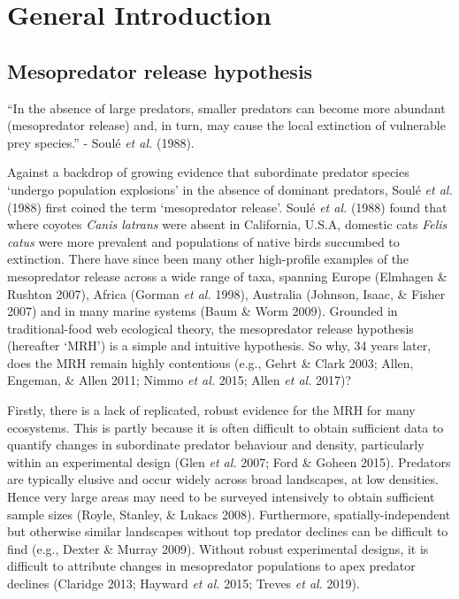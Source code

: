 \documentclass[11pt,a4paper,titlepage,twoside,openright]{style/unimelbthesis}
\begin{document}
\begin{mainmatter}

\hypertarget{general-introduction}{%
\chapter{General Introduction}\label{general-introduction}}

\hypertarget{mesopredator-release-hypothesis}{%
\section{Mesopredator release hypothesis}\label{mesopredator-release-hypothesis}}

``In the absence of large predators, smaller predators can become more abundant (mesopredator release) and, in turn, may cause the local extinction of vulnerable prey species.'' - Soulé \emph{et al.} (1988).

Against a backdrop of growing evidence that subordinate predator species `undergo population explosions' in the absence of dominant predators, Soulé \emph{et al.} (1988) first coined the term `mesopredator release'. Soulé \emph{et al.} (1988) found that where coyotes \emph{Canis latrans} were absent in California, U.S.A, domestic cats \emph{Felis catus} were more prevalent and populations of native birds succumbed to extinction. There have since been many other high-profile examples of the mesopredator release across a wide range of taxa, spanning Europe (Elmhagen \& Rushton 2007), Africa (Gorman \emph{et al.} 1998), Australia (Johnson, Isaac, \& Fisher 2007) and in many marine systems (Baum \& Worm 2009). Grounded in traditional-food web ecological theory, the mesopredator release hypothesis (hereafter `MRH') is a simple and intuitive hypothesis. So why, 34 years later, does the MRH remain highly contentious (e.g., Gehrt \& Clark 2003; Allen, Engeman, \& Allen 2011; Nimmo \emph{et al.} 2015; Allen \emph{et al.} 2017)?

Firstly, there is a lack of replicated, robust evidence for the MRH for many ecosystems. This is partly because it is often difficult to obtain sufficient data to quantify changes in subordinate predator behaviour and density, particularly within an experimental design (Glen \emph{et al.} 2007; Ford \& Goheen 2015). Predators are typically elusive and occur widely across broad landscapes, at low densities. Hence very large areas may need to be surveyed intensively to obtain sufficient sample sizes (Royle, Stanley, \& Lukacs 2008). Furthermore, spatially-independent but otherwise similar landscapes without top predator declines can be difficult to find (e.g., Dexter \& Murray 2009). Without robust experimental designs, it is difficult to attribute changes in mesopredator populations to apex predator declines (Claridge 2013; Hayward \emph{et al.} 2015; Treves \emph{et al.} 2019).


\end{mainmatter}
\end{document}
